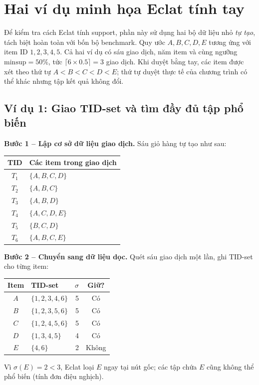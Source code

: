 \section{Hai ví dụ minh họa Eclat tính tay}
\label{sec:hand-examples}
Để kiểm tra cách Eclat tính support, phần này sử dụng hai bộ dữ liệu nhỏ \emph{tự tạo}, tách biệt hoàn toàn với bốn bộ benchmark. Quy ước $A,B,C,D,E$ tương ứng với item ID $1,2,3,4,5$. Cả hai ví dụ có sáu giao dịch, năm item và cùng ngưỡng $\mathrm{minsup}=50\%$, tức $\lceil 6\times0.5\rceil=3$ giao dịch. Khi duyệt bằng tay, các item được xét theo thứ tự $A<B<C<D<E$; thứ tự duyệt thực tế của chương trình có thể khác nhưng tập kết quả không đổi.

\subsection{Ví dụ 1: Giao TID-set và tìm đầy đủ tập phổ biến}
\noindent\textbf{Bước 1 -- Lập cơ sở dữ liệu giao dịch.} Sáu giỏ hàng tự tạo như sau:
\begin{center}
\small
\begin{tabular}{@{}cl@{}}\toprule
TID & Các item trong giao dịch\\\midrule
$T_1$ & $\{A,B,C,D\}$\\
$T_2$ & $\{A,B,C\}$\\
$T_3$ & $\{A,B,D\}$\\
$T_4$ & $\{A,C,D,E\}$\\
$T_5$ & $\{B,C,D\}$\\
$T_6$ & $\{A,B,C,E\}$\\\bottomrule
\end{tabular}
\end{center}
\noindent\textbf{Bước 2 -- Chuyển sang dữ liệu dọc.} Quét sáu giao dịch một lần, ghi TID-set cho từng item:
\begin{center}
\footnotesize
\setlength{\tabcolsep}{3pt}
\begin{tabular}{@{}clrc@{}}\toprule
Item & TID-set & $\sigma$ & Giữ?\\\midrule
$A$ & $\{1,2,3,4,6\}$ & 5 & Có\\
$B$ & $\{1,2,3,5,6\}$ & 5 & Có\\
$C$ & $\{1,2,4,5,6\}$ & 5 & Có\\
$D$ & $\{1,3,4,5\}$   & 4 & Có\\
$E$ & $\{4,6\}$       & 2 & Không\\\bottomrule
\end{tabular}
\end{center}
Vì $\sigma(E)=2<3$, Eclat loại $E$ ngay tại nút gốc; các tập chứa $E$ cũng không thể phổ biến (tính đơn điệu nghịch).


